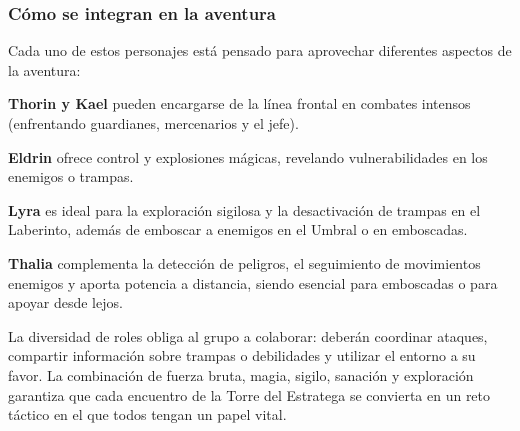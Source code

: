 \documentclass[
  twocolumn]{article}
\begin{document}
\subsubsection{Cómo se integran en la
aventura}\label{cuxf3mo-se-integran-en-la-aventura}

Cada uno de estos personajes está pensado para aprovechar diferentes
aspectos de la aventura:

\textbf{Thorin y Kael} pueden encargarse de la línea frontal en combates
intensos (enfrentando guardianes, mercenarios y el jefe).

\textbf{Eldrin} ofrece control y explosiones mágicas, revelando
vulnerabilidades en los enemigos o trampas.

\textbf{Lyra} es ideal para la exploración sigilosa y la desactivación
de trampas en el Laberinto, además de emboscar a enemigos en el Umbral o
en emboscadas.

\textbf{Thalia} complementa la detección de peligros, el seguimiento de
movimientos enemigos y aporta potencia a distancia, siendo esencial para
emboscadas o para apoyar desde lejos.

La diversidad de roles obliga al grupo a colaborar: deberán coordinar
ataques, compartir información sobre trampas o debilidades y utilizar el
entorno a su favor. La combinación de fuerza bruta, magia, sigilo,
sanación y exploración garantiza que cada encuentro de la Torre del
Estratega se convierta en un reto táctico en el que todos tengan un
papel vital.
\end{document}
